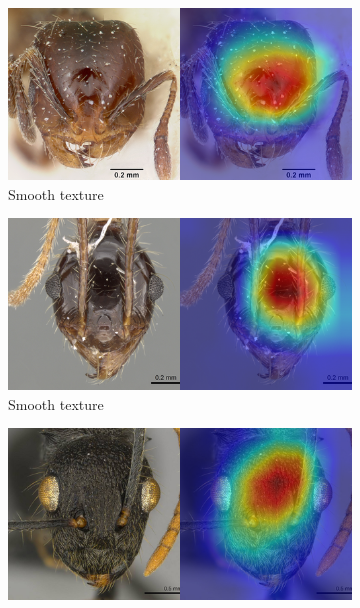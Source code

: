 \documentclass{aci}
\numberwithin{equation}{section}
\begin{document}
\newcommand{\subwidth}{0.35\textwidth}
\begin{figure}
    \centering
    \begin{subfigure}{\subwidth}
        \includegraphics[width=1\linewidth]{thesis_assets/gradcam/correct_ideal/518.png}
        \caption*{Smooth texture}
        \label{fig:correct_ideal_518}
    \end{subfigure}
    \begin{subfigure}{\subwidth}
        \includegraphics[width=1\linewidth]{thesis_assets/gradcam/correct_ideal/808.png}
        \caption*{Smooth texture}
        \label{fig:correct_ideal_808}
    \end{subfigure}
    \begin{subfigure}{\subwidth}
        \includegraphics[width=1\linewidth]{thesis_assets/gradcam/correct_ideal/842.png}

\end{subfigure}
\end{figure}
\end{document}
